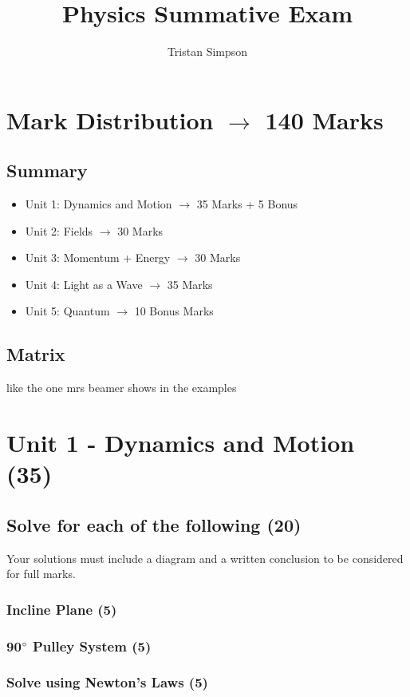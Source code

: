 \documentclass{article}
\title{Physics Summative Exam}
\author{Tristan Simpson}
\begin{document}
\maketitle
\tableofcontents
\doublespacing

\section{Mark Distribution $\to$ 140 Marks}
\subsection{Summary}
\begin{itemize}
    \item Unit 1: Dynamics and Motion $\to$ 35 Marks + 5 Bonus
    \item Unit 2: Fields $\to$ 30 Marks
    \item Unit 3: Momentum + Energy $\to$ 30 Marks
    \item Unit 4: Light as a Wave $\to$ 35 Marks
    \item Unit 5: Quantum $\to$ 10 Bonus Marks
\end{itemize}

\subsection{Matrix}
like the one mrs beamer shows in the examples

\section{Unit 1 - Dynamics and Motion (35)}
\subsection{Solve for each of the following (20)}
Your solutions must include a diagram and a written conclusion to be considered for full marks.

\subsubsection{Incline Plane (5)}
\subsubsection{90$\degree$ Pulley System (5)}
\subsubsection{Solve using Newton's Laws (5)}
\end{document}
